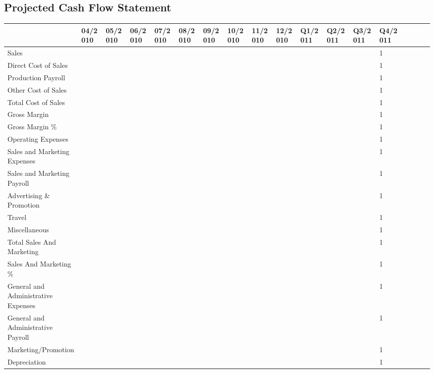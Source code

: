 \documentclass[11pt,a4paper,titlepage]{article}
\begin{document}
\begin{landscape}
\subsection{Projected Cash Flow Statement}
\begin{scriptsize}
\begin{tabular}{ | l | l | l | l | l | l | l | l | l | l | l | l | l | l | l | l | l | l |}\hline
  & 04/2010 & 05/2010 & 06/2010 & 07/2010 & 08/2010 & 09/2010 & 10/2010 & 11/2010 & 12/2010 & Q1/2011 & Q2/2011 & Q3/2011 & Q4/2011\\\hline
  Sales & & & & & & & & & & & & & 1\\\hline
  Direct Cost of Sales & & & & & & & & & & & & & 1\\\hline
  Production Payroll & & & & & & & & & & & & & 1\\\hline
  Other Cost of Sales & & & & & & & & & & & & & 1\\\hline
  Total Cost of Sales & & & & & & & & & & & & & 1\\\hline
  Gross Margin & & & & & & & & & & & & & 1\\\hline
  Gross Margin \% & & & & & & & & & & & & & 1\\\hline
  Operating Expenses & & & & & & & & & & & & & 1\\\hline
  Sales and Marketing Expenses & & & & & & & & & & & & & 1\\\hline
  Sales and Marketing Payroll & & & & & & & & & & & & & 1\\\hline
  Advertising \& Promotion & & & & & & & & & & & & & 1\\\hline
  Travel & & & & & & & & & & & & & 1\\\hline
  Miscellaneous & & & & & & & & & & & & & 1\\\hline
  Total Sales And Marketing & & & & & & & & & & & & & 1\\\hline
  Sales And Marketing \% & & & & & & & & & & & & & 1\\\hline
  General and Administrative Expenses & & & & & & & & & & & & & 1\\\hline
  General and Administrative Payroll & & & & & & & & & & & & & 1\\\hline
  Marketing/Promotion & & & & & & & & & & & & & 1\\\hline
  Depreciation & & & & & & & & & & & & & 1\\\hline

\end{tabular}
\end{scriptsize}
\end{landscape}
\end{document}

